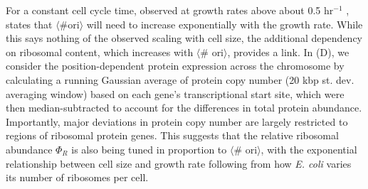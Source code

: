 For a constant cell cycle time, observed at growth rates above about 0.5
hr$^{-1}$ \citep{helmstetter1968},  states that $\langle \text{\# ori}
\rangle$ will need to increase exponentially with the growth rate. While this
says nothing of the observed scaling with cell size, the additional dependency
on ribosomal content, which increases with $\langle$\# ori$\rangle$, provides a
link. In (D), we consider the
position-dependent protein expression across the chromosome by calculating a
running Gaussian average of protein copy number (20 kbp st. dev. averaging
window) based on each gene's transcriptional start site, which were then
median-subtracted to account for the differences in total protein abundance.
Importantly, major deviations in protein copy number are largely restricted to
regions of ribosomal protein genes. This suggests that the relative ribosomal
abundance $\Phi_R$ is also being tuned in proportion to $\langle$\#
ori$\rangle$, with the exponential relationship between  cell size and growth
rate following from how \textit{E. coli} varies its number of ribosomes per
cell.


